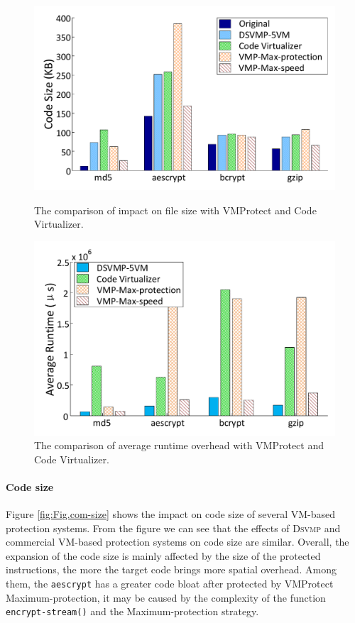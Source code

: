 \documentclass[preprint,12pt,3p]{elsarticle}
\newcommand{\DSVMP}{\textsc{Dsvmp}\xspace}
\begin{document}
\begin{figure}[t]
\centering
\begin{minipage}[t]{0.49\linewidth}
\centering
\includegraphics[width=.9\textwidth]{figure/comsize.pdf}
\caption{The comparison of impact on file size with VMProtect and Code Virtualizer.}\label{fig:Fig.com-size}
\end{minipage}
\hspace{0.005\textwidth}
\begin{minipage}[t]{0.49\linewidth}
\centering
\includegraphics[width=.9\textwidth]{figure/comtime.pdf}
\caption{The comparison of average runtime overhead with VMProtect and Code Virtualizer.}\label{fig:Fig.com-time}
\end{minipage}
\end{figure}


\paragraph*{Code size} Figure \ref{fig:Fig.com-size} shows the impact on code size of several VM-based protection systems.
From the figure we can see that the effects of \DSVMP and commercial VM-based protection systems on code size are similar.
Overall, the expansion of the code size is mainly affected by the size of the protected instructions,
the more the target code brings more spatial overhead.
Among them, the \texttt{aescrypt} has a greater code bloat after protected by VMProtect Maximum-protection,
it may be caused by the complexity of the function \texttt{encrypt-stream()} and the Maximum-protection strategy.
\end{document}
